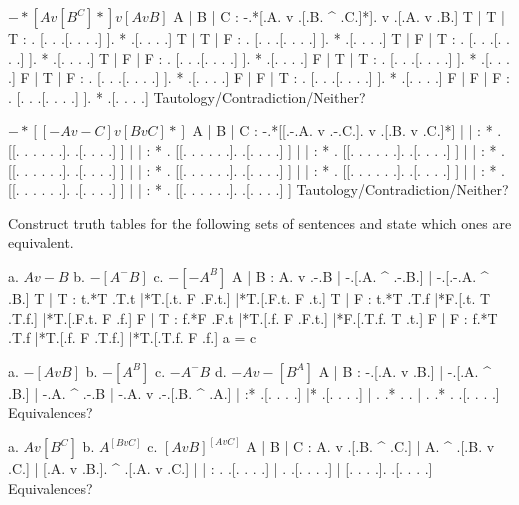 $ -*[A v [B ^ C]*] v [A v B] $
        \answer
        \truthtable
         A | B | C : -.*[.A. v .[.B. ^ .C.]*].  v  .[.A. v .B.]
        \truthtableline
         T | T | T :  . [. .   .[. .   . .] ]. *   .[. .   . .]
         T | T | F :  . [. .   .[. .   . .] ]. *   .[. .   . .]
         T | F | T :  . [. .   .[. .   . .] ]. *   .[. .   . .]
         T | F | F :  . [. .   .[. .   . .] ]. *   .[. .   . .]
         F | T | T :  . [. .   .[. .   . .] ]. *   .[. .   . .]
         F | T | F :  . [. .   .[. .   . .] ]. *   .[. .   . .]
         F | F | T :  . [. .   .[. .   . .] ]. *   .[. .   . .]
         F | F | F :  . [. .   .[. .   . .] ]. *   .[. .   . .]
        \endtruthtable
        Tautology/Contradiction/Neither?
        \endanswer

$ -*[[-A v -C] v [B v C]*] $
        \answer
        \truthtable
         A | B | C :  -.*[[.-.A. v .-.C.]. v .[.B. v .C.]*]
        \truthtableline
           |   |   : * . [[. . .   . . .].   .[. .   . .] ]
           |   |   : * . [[. . .   . . .].   .[. .   . .] ]
           |   |   : * . [[. . .   . . .].   .[. .   . .] ]
           |   |   : * . [[. . .   . . .].   .[. .   . .] ]
           |   |   : * . [[. . .   . . .].   .[. .   . .] ]
           |   |   : * . [[. . .   . . .].   .[. .   . .] ]
           |   |   : * . [[. . .   . . .].   .[. .   . .] ]
           |   |   : * . [[. . .   . . .].   .[. .   . .] ]
        \endtruthtable
        Tautology/Contradiction/Neither?
        \endanswer

\endproblems

Construct truth tables for the following sets of sentences and state which ones are equivalent.

\problems
{}
\list
a. $ A v -B $
b. $ -[A ^ -B] $
c. $ -[-A ^ B] $
\endlist
        \answer
        \truthtable
         A | B : A. v .-.B | -.[.A. ^ .-.B.] | -.[.-.A. ^ .B.]
        \truthtableline
         T | T : t.*T .T.t |*T.[.t. F .F.t.] |*T.[.F.t. F .t.]
         T | F : t.*T .T.f |*F.[.t. T .T.f.] |*T.[.F.t. F .f.]
         F | T : f.*F .F.t |*T.[.f. F .F.t.] |*F.[.T.f. T .t.]
         F | F : f.*T .T.f |*T.[.f. F .T.f.] |*T.[.T.f. F .f.]
        \endtruthtable
        a = c
        \endanswer

\list
a. $ -[A v B] $
b. $ -[A ^ B] $
c. $ -A ^ -B $
d. $ -A v -[B ^ A] $
\endlist
        \answer
        \truthtable
         A | B : -.[.A. v .B.] | -.[.A. ^ .B.] | -.A. ^ .-.B | -.A. v .-.[.B. ^ .A.]
        \truthtableline
           |   :* .[. .   . .] |* .[. .   . .] |  . .*  . .  |  . .*  . .[. .   . .]
        \endtruthtable
        Equivalences?
        \endanswer

\list
a. $ A v [B ^ C] $
b. $ A ^ [B v C] $
c. $ [A v B] ^ [A v C] $
\endlist
        \answer
        \truthtable
         A | B | C : A. v .[.B. ^ .C.] | A. ^ .[.B. v .C.] | [.A. v .B.]. ^ .[.A. v .C.]
        \truthtableline
           |   |   :  .   .[. .   . .] |  .   .[. .   . .] | [. .   . .].   .[. .   . .]
        \endtruthtable
        Equivalences?
        \endanswer

\endproblems
\bye
